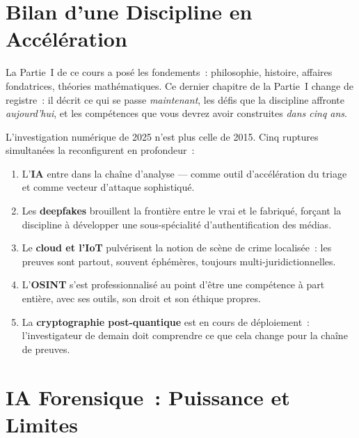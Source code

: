 \section*{Bilan d'une Discipline en Accélération}

La Partie~I de ce cours a posé les fondements~: philosophie, histoire,
affaires fondatrices, théories mathématiques. Ce dernier chapitre de la
Partie~I change de registre~: il décrit ce qui se passe \emph{maintenant},
les défis que la discipline affronte \emph{aujourd'hui}, et les compétences
que vous devrez avoir construites \emph{dans cinq ans}.

\medskip

L'investigation numérique de 2025 n'est plus celle de 2015. Cinq ruptures
simultanées la reconfigurent en profondeur~:
\begin{enumerate}
    \item L'\textbf{IA} entre dans la chaîne d'analyse --- comme outil
          d'accélération du triage et comme vecteur d'attaque sophistiqué.
    \item Les \textbf{deepfakes} brouillent la frontière entre le vrai
          et le fabriqué, forçant la discipline à développer une
          sous-spécialité d'authentification des médias.
    \item Le \textbf{cloud et l'IoT} pulvérisent la notion de scène de
          crime localisée~: les preuves sont partout, souvent éphémères,
          toujours multi-juridictionnelles.
    \item L'\textbf{OSINT} s'est professionnalisé au point d'être une
          compétence à part entière, avec ses outils, son droit et son
          éthique propres.
    \item La \textbf{cryptographie post-quantique} est en cours de
          déploiement~: l'investigateur de demain doit comprendre ce que
          cela change pour la chaîne de preuves.
\end{enumerate}

\separateur

\section{IA Forensique~: Puissance et Limites}
\label{sec:ia-forensique}

